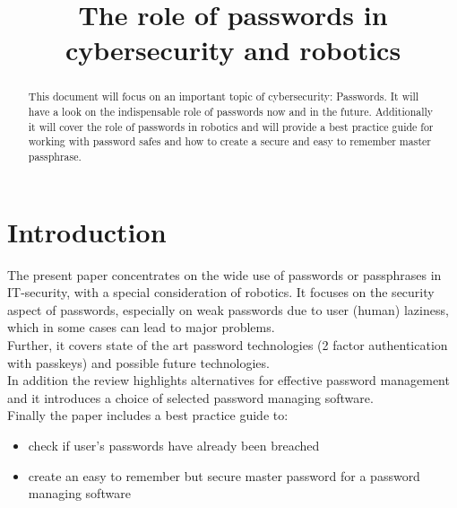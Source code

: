 \documentclass[conference]{IEEEtran}
\begin{document}
\title{The role of passwords in cybersecurity and robotics}
\author{
\and
{}
\and
{}
\and
{}
}
\maketitle

\begin{abstract}
This document will focus on an important topic of cybersecurity: Passwords. It will have a look on the indispensable role of passwords now and in the future. Additionally it will cover the role of passwords in robotics and will provide a best practice guide for working with password safes and how to create a secure and easy to remember master passphrase.

\end{abstract}


\section{Introduction}
The present paper concentrates on the wide use of passwords or passphrases in IT-security, with a special consideration of robotics. It focuses on the security aspect of passwords, especially on weak passwords due to user (human) laziness, which in some cases can lead to major problems. \\
Further, it covers state of the art password technologies (2 factor authentication with passkeys) and possible future technologies.\\
In addition the review highlights alternatives for effective password management and it introduces a choice of selected password managing software. \\
Finally the paper includes a best practice guide to:
\begin{itemize}
\item check if user's passwords have already been breached 
\item create an easy to remember but secure master password for a password managing software
\end{itemize} 
\end{document}
